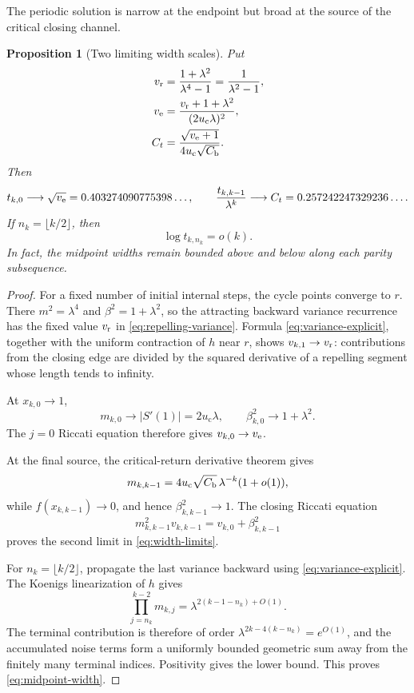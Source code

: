 \documentclass[11pt]{article}
\newtheorem{proposition}[theorem]{Proposition}
\theoremstyle{definition}
\theoremstyle{remark}
\newcommand{\uc}{u_{\mathrm c}}
\begin{document}
The periodic solution is narrow at the endpoint but broad at the source of
the critical closing channel.

\begin{proposition}[Two limiting width scales]
\label{prop:width-asymptotics}
Put
\begin{align}
 v_{\rm r}&=\frac{1+\lambda^2}{\lambda^4-1}
 =\frac1{\lambda^2-1},
 \label{eq:repelling-variance}\\
 v_{\rm e}&=\frac{v_{\rm r}+1+\lambda^2}{(2\uc\lambda)^2},
 \label{eq:endpoint-variance}\\
 C_t&=\frac{\sqrt{v_{\rm e}+1}}
 {4\uc\sqrt{C_{\rm b}}}.
 \label{eq:critical-width-constant}
\end{align}
Then
\begin{equation}\label{eq:width-limits}
 t_{k,0}\longrightarrow\sqrt{v_{\rm e}}
 =0.403274090775398\ldots,
 \qquad
 \frac{t_{k,k-1}}{\lambda^k}\longrightarrow C_t
 =0.257242247329236\ldots.
\end{equation}
If $n_k=\lfloor k/2\rfloor$, then
\begin{equation}\label{eq:midpoint-width}
 \log t_{k,n_k}=o(k).
\end{equation}
In fact, the midpoint widths remain bounded above and below along each parity
subsequence.
\end{proposition}

\begin{proof}
For a fixed number of initial internal steps, the cycle points converge to
$r$.  There $m^2=\lambda^4$ and $\beta^2=1+\lambda^2$, so the attracting
backward variance recurrence has the fixed value $v_{\rm r}$ in
\eqref{eq:repelling-variance}.  Formula
\eqref{eq:variance-explicit}, together with the uniform contraction of $h$
near $r$, shows $v_{k,1}\to v_{\rm r}$: contributions from the closing edge
are divided by the squared derivative of a repelling segment whose length
tends to infinity.

At $x_{k,0}\to1$,
\[
 m_{k,0}\to|S'(1)|=2\uc\lambda,
 \qquad
 \beta_{k,0}^2\to1+\lambda^2.
\]
The $j=0$ Riccati equation therefore gives
$v_{k,0}\to v_{\rm e}$.

At the final source, the critical-return derivative theorem gives
\begin{equation}\label{eq:last-multiplier}
 m_{k,k-1}
 =4\uc\sqrt{C_{\rm b}}\,\lambda^{-k}(1+o(1)),
\end{equation}
while $f(x_{k,k-1})\to0$, and hence
$\beta_{k,k-1}^2\to1$.  The closing Riccati equation
\[
 m_{k,k-1}^2v_{k,k-1}=v_{k,0}+\beta_{k,k-1}^2
\]
proves the second limit in \eqref{eq:width-limits}.

For $n_k=\lfloor k/2\rfloor$, propagate the last variance backward using
\eqref{eq:variance-explicit}.  The Koenigs linearization of $h$ gives
\[
 \prod_{j=n_k}^{k-2}m_{k,j}
 =\lambda^{2(k-1-n_k)+O(1)}.
\]
The terminal contribution is therefore of order
$\lambda^{2k-4(k-n_k)}=e^{O(1)}$, and the accumulated noise terms form a
uniformly bounded geometric sum away from the finitely many terminal
indices.  Positivity gives the lower bound.  This proves
\eqref{eq:midpoint-width}.
\end{proof}
\end{document}
